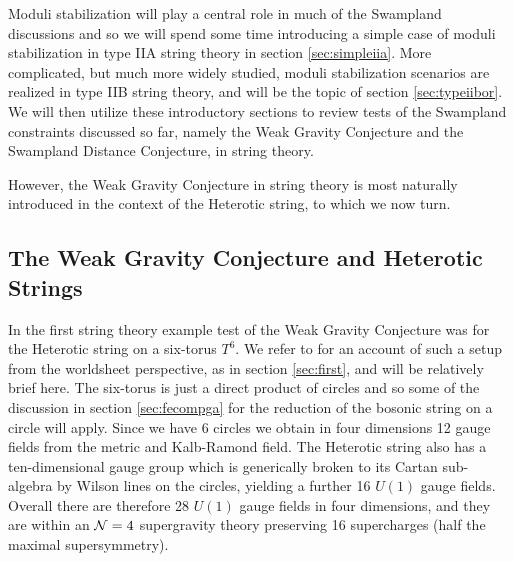 \documentclass[11pt,a4paper]{article}
\numberwithin{equation}{section}
\numberwithin{table}{section}\setlength{\multlinegap}{25pt}
\begin{document}
Moduli stabilization will play a central role in much of the Swampland discussions and so we will spend some time introducing a simple case of moduli stabilization in type IIA string theory in section \ref{sec:simpleiia}. More complicated, but much more widely studied, moduli stabilization scenarios are realized in type IIB string theory, and will be the topic of section \ref{sec:typeiibor}. We will then utilize these introductory sections to review tests of the Swampland constraints discussed so far, namely the Weak Gravity Conjecture and the Swampland Distance Conjecture, in string theory.

However, the Weak Gravity Conjecture in string theory is most naturally introduced in the context of the Heterotic string, to which we now turn.

\subsection{The Weak Gravity Conjecture and Heterotic Strings}
\label{sec:wgchet}

In \cite{ArkaniHamed:2006dz} the first string theory example test of the Weak Gravity Conjecture was for the Heterotic string on a six-torus $T^6$. We refer to \cite{Blumenhagen:2013fgp} for an account of such a setup from the worldsheet perspective, as in section \ref{sec:first}, and will be relatively brief here. The six-torus is just a direct product of circles and so some of the discussion in section \ref{sec:fecompga} for the reduction of the bosonic string on a circle will apply. Since we have 6 circles we obtain in four dimensions 12 gauge fields from the metric and Kalb-Ramond field. The Heterotic string also has a ten-dimensional gauge group which is generically broken to its Cartan sub-algebra by Wilson lines on the circles, yielding a further 16 $U(1)$ gauge fields. Overall there are therefore 28 $U(1)$ gauge fields in four dimensions, and they are within an ${\cal N}=4$ supergravity theory preserving 16 supercharges (half the maximal supersymmetry). 
\end{document}
